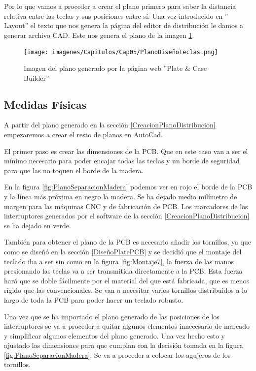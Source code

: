 Por lo que vamos a proceder a crear el plano primero para saber la distancia relativa entre las teclas y sus posiciones entre sí. Una vez introducido en '' Layout'' el texto que nos genera la página del editor de distribución le damos a generar archivo CAD. Este nos genera el plano de la imagen \ref{fig:PlanoDistribucionLayout}.

\begin{figure}[H]
    \centering
    \texttt{[image: imagenes/Capitulos/Cap05/PlanoDiseñoTeclas.png]}
    \caption{Imagen del plano generado por la página web ''Plate \& Case Builder'' \cite{builder-swillkb}}
    \label{fig:PlanoDistribucionLayout}
\end{figure}

\subsection{Medidas Físicas}

A partir del plano generado en la sección \ref{CreacionPlanoDistribucion} empezaremos a crear el resto de planos en AutoCad.

El primer paso es crear las dimensiones de la \gls{PCB}. Que en este caso van a ser el mínimo necesario para poder encajar todas las teclas y un borde de seguridad para que las  no toquen el borde de la madera.

En la figura \ref{fig:PlanoSeparacionMadera} podemos ver en rojo el borde de la \gls{PCB} y la línea más próxima en negro la madera. Se ha dejado medio milímetro de margen para las máquinas CNC y de fabricación de \gls{PCB}. Los marcadores de los interruptores generados por el software de la sección \ref{CreacionPlanoDistribucion} se ha dejado en verde.

También para obtener el plano de la \gls{PCB} es necesario añadir los tornillos, ya que como se diseñó en la sección \ref{DiseñoPlatePCB} y se decidió que el montaje del teclado iba a ser sin  como en la figura \ref{fig:Montaje7}, la fuerza de las manos presionando las teclas va a ser transmitida directamente a la \gls{PCB}. Esta fuerza hará que se doble fácilmente por el material del que está fabricada, que es menos rígido que las  convencionales. Se van a necesitar varios tornillos distribuidos a lo largo de toda la \gls{PCB} para poder hacer un teclado robusto.

Una vez que se ha importado el plano generado de las posiciones de los interruptores se va a proceder a quitar algunos elementos innecesario de marcado y simplificar algunos elementos del plano generado. Una vez hecho esto y ajustado las dimensiones para que cumplan con la decisión tomada en la figura \ref{fig:PlanoSeparacionMadera}. Se va a proceder a colocar los agujeros de los tornillos.

